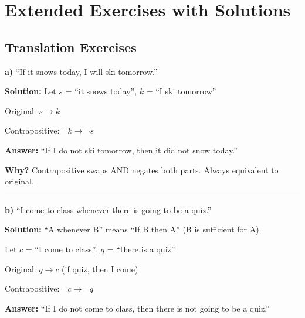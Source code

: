 \documentclass[11pt,a4paper]{article}
\begin{document}
\newpage

\section{Extended Exercises with Solutions}

\subsection{Translation Exercises}

\begin{examplebox}
\textbf{a)} ``If it snows today, I will ski tomorrow.''

\textbf{Solution:} Let $s$ = ``it snows today'', $k$ = ``I ski tomorrow''

Original: $s \to k$

Contrapositive: $\neg k \to \neg s$

\textbf{Answer:} ``If I do not ski tomorrow, then it did not snow today.''

\textbf{Why?} Contrapositive swaps AND negates both parts. Always equivalent to original.

\rule{\linewidth}{0.3pt}

\textbf{b)} ``I come to class whenever there is going to be a quiz.''

\textbf{Solution:} ``A whenever B'' means ``If B then A'' (B is sufficient for A).

Let $c$ = ``I come to class'', $q$ = ``there is a quiz''

Original: $q \to c$ (if quiz, then I come)

Contrapositive: $\neg c \to \neg q$

\textbf{Answer:} ``If I do not come to class, then there is not going to be a quiz.''
\end{examplebox}
\end{document}
